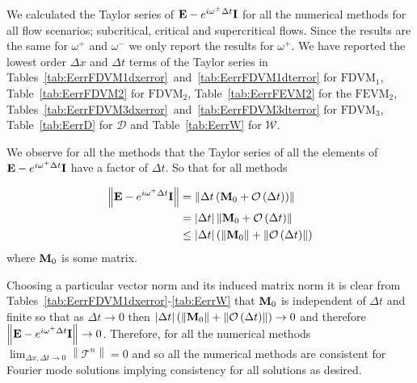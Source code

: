We calculated the Taylor series of $\mathbf{E} -  e^{i \omega^\pm \Delta t}\mathbf{I}$ for all the numerical methods for all flow scenarios; subcritical, critical and supercritical flows. Since the results are the same for $\omega^+$ and $\omega^-$ we only report the results for $\omega^+$. We have reported the lowest order $\Delta x$ and $\Delta t$ terms of the Taylor series in Tables~\ref{tab:EerrFDVM1dxerror}~and~\ref{tab:EerrFDVM1dterror}  for $\text{FDVM}_1$, Table~\ref{tab:EerrFDVM2} for $\text{FDVM}_2$, Table~\ref{tab:EerrFEVM2} for the $\text{FEVM}_2$, Tables~\ref{tab:EerrFDVM3dxerror}~and~\ref{tab:EerrFDVM3dterror} for $\text{FDVM}_3$, Table~\ref{tab:EerrD} for $\mathcal{D}$ and Table~\ref{tab:EerrW} for $\mathcal{W}$. 

We observe for all the methods that the Taylor series of all the elements of $\mathbf{E} -  e^{i \omega^+ \Delta t}\mathbf{I}$ have a factor of $\Delta t$. So that for all methods 

\begin{align*}
\left \| \mathbf{E} -  e^{i \omega^+ \Delta t}\mathbf{I} \right \| &=  \left \| \Delta t \left(\mathbf{M}_0 +  \mathcal{O}\left(\Delta t\right)\right)\right \|  \nonumber\\ &= |\Delta t|  \left \| \mathbf{M}_0 +  \mathcal{O}\left(\Delta t\right)\right \|
 \nonumber\\ &\le  |\Delta t| \left(\left \| \mathbf{M}_0 \right \| + \left \| \mathcal{O}\left(\Delta t\right)\right \|\right)
\end{align*} 
where $\mathbf{M}_0$ is some matrix.

Choosing a particular vector norm and its induced matrix norm it is clear from Tables~\ref{tab:EerrFDVM1dxerror}-\ref{tab:EerrW} that $\mathbf{M}_0$ is independent of $\Delta t$ and finite so that as $\Delta t \rightarrow 0$ then $|\Delta t| \left(\left \| \mathbf{M}_0 \right \| + \left \| \mathcal{O}\left(\Delta t\right)\right \|\right)  \rightarrow 0$  and therefore  $\left \| \mathbf{E} -  e^{i \omega^+ \Delta t}\mathbf{I} \right \| \rightarrow 0$. Therefore, for all the numerical methods $ \lim_{\Delta x,\Delta t \rightarrow 0}\left \| \mathcal{T}^n \right \| = 0 $ and so all the numerical methods are consistent for Fourier mode solutions implying consistency for all solutions as desired. 

